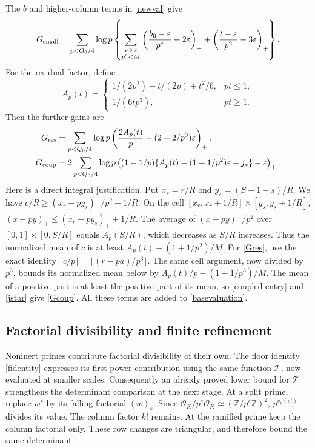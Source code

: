 \documentclass[11pt]{article}
\newcommand{\Z}{\mathbb Z}
\newcommand{\OK}{\mathcal O_K}
\newcommand{\Tn}{\mathcal T}
\begin{document}
The \(b\) and higher-column terms in \eqref{newval} give
\begin{equation}\label{Gsmall}
 G_{\rm small}=\sum_{p<Q_0/4}\log p\left\{
 \sum_{\substack{e\ge2\\p^e<M}}
       \left(\frac{b_0-\varepsilon}{p^e}-2\varepsilon\right)_+
 +\left(\frac{t-\varepsilon}{p^2}-3\varepsilon\right)_+
 \right\}.
\end{equation}
For the residual factor, define
\[
 A_p(t)=
 \begin{cases}
  1/(2p^2)-t/(2p)+t^2/6,&pt\le1,\\
  1/(6tp^3),&pt\ge1.
 \end{cases}
\]
Then the further gains are
\begin{align}
 G_{\rm res}&=\sum_{p<Q_0/4}\log p
       \left(\frac{2A_p(t)}p-(2+2/p^3)\varepsilon\right)_+,
       \label{Gres}\\
 G_{\rm coup}&=2\sum_{p<Q_0/4}\log p
       \left((1-1/p)\{A_p(t)-(1+1/p^2)\varepsilon-j_*\}
                         -\varepsilon\right)_+.
       \label{Gcoup}
\end{align}
Here is a direct integral justification. Put \(x_r=r/R\) and
\(y_s=(S-1-s)/R\). We have
\(c/R\ge (x_r-py_s)_+/p^2-1/R\).
On the cell \([x_r,x_r+1/R]\times[y_s,y_s+1/R]\),
\((x-py)_+\le(x_r-py_s)_++1/R\).
The average of \((x-py)_+/p^2\) over
\([0,1]\times[0,S/R]\) equals \(A_p(S/R)\), which decreases
as \(S/R\) increases. Thus the normalized mean of
\(c\) is at least \(A_p(t)-(1+1/p^2)/M\).
For \eqref{Gres}, use the exact identity
\(\lfloor c/p\rfloor=\lfloor(r-pa)/p^3\rfloor\).
The same cell argument, now divided by \(p^3\), bounds its
normalized mean below by \(A_p(t)/p-(1+1/p^3)/M\).
The mean of a positive part is at least the positive
part of its mean, so \eqref{coupled-entry} and \eqref{jstar} give
\eqref{Gcoup}. All these terms are added to \eqref{basevaluation}.

\subsection{Factorial divisibility and finite refinement}\label{factorials}
Noninert primes contribute factorial divisibility of their own. The
floor identity \eqref{fidentity} expresses its first-power contribution
using the same function \(\Tn\), now evaluated at smaller scales.
Consequently an already proved lower bound for \(\Tn\) strengthens
the determinant comparison at the next stage.
At a split prime, replace \(w^s\) by its falling factorial
\((w)_s\). Since \(\OK/p^e\OK\simeq(\Z/p^e\Z)^2\),
\(p^{v_p(s!)}\) divides its value. The column factor \(k!\) remains.
At the ramified prime keep the column factorial only. These row
changes are triangular, and therefore bound the same determinant.
\end{document}
